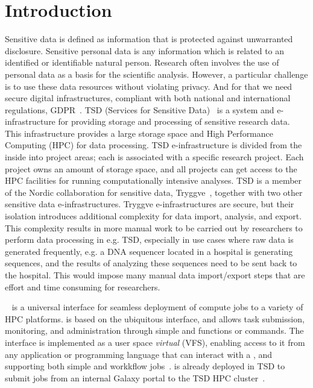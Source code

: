 
\section{Introduction}
\label{sec:intro}

Sensitive data is defined as information that is protected against unwarranted disclosure. Sensitive personal data is any information which is related to an identified or identifiable natural person. Research often involves the use of personal data as a basis for the scientific analysis. However, a particular challenge is to use these data resources without violating privacy. And for that we need secure digital infrastructures, compliant with both national and international regulations, GDPR~\cite{gdpr}.
TSD (Services for Sensitive Data)~\cite{tsd} is a system and e-infrastructure for providing storage and processing of sensitive research data. This infrastructure provides a large storage space and  High Performance Computing (HPC) for data processing. TSD e-infrastructure is divided from the inside into project areas; each is associated with a specific research project. Each project owns an amount of storage space, and all projects can get access to the HPC facilities for running computationally intensive analyses. TSD is a member of the Nordic collaboration for sensitive data, Tryggve~\cite{tryggve}, together with two other sensitive data e-infrastructures. Tryggve e-infrastructures are secure, but their isolation introduces additional complexity for data import, analysis, and export. This complexity results in more manual work to be carried out by researchers to perform data processing in e.g. TSD, especially in use cases where raw data is generated frequently, e.g. a DNA sequencer located in a hospital is generating sequences, and the results of analyzing these sequences need to be sent back to the hospital. This would impose many manual data import/export steps that are effort and time consuming for researchers.   

\name~\cite{stroll} is a universal interface for seamless deployment of compute jobs to a variety of HPC platforms. \name is based on the ubiquitous \fs interface, and allows task submission, monitoring, and administration through simple \rc and \wc \fs functions or commands. The interface is implemented as a user space \emph{virtual \fs}(VFS), enabling access to it from any application or programming language that can interact with a \fs, and supporting both simple and workkflow jobs~\cite{stroll2}. \name is already deployed in TSD to submit jobs from an internal Galaxy portal to the TSD HPC cluster~\cite{docker-galaxy-stroll}.

